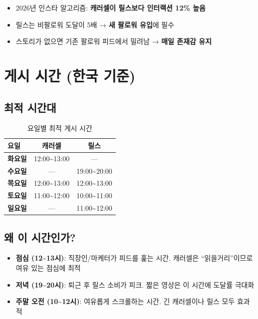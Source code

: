 \documentclass[11pt, a4paper]{article}
\begin{document}
\begin{itemize}[leftmargin=2em]
  \item 2026년 인스타 알고리즘: \textbf{캐러셀이 릴스보다 인터랙션 12\% 높음}
  \item 릴스는 비팔로워 도달이 5배 → \textbf{새 팔로워 유입}에 필수
  \item 스토리가 없으면 기존 팔로워 피드에서 밀려남 → \textbf{매일 존재감 유지}
\end{itemize}


\section{게시 시간 (한국 기준)}

\subsection{최적 시간대}

\begin{table}[h!]
\centering
\begin{tabular}{l c c}
\toprule
\textbf{요일} & \textbf{캐러셀} & \textbf{릴스} \\
\midrule
\textbf{화요일} & 12:00\textasciitilde 13:00 & — \\
\textbf{수요일} & — & 19:00\textasciitilde 20:00 \\
\textbf{목요일} & 12:00\textasciitilde 13:00 & 12:00\textasciitilde 13:00 \\
\textbf{토요일} & 11:00\textasciitilde 12:00 & 10:00\textasciitilde 11:00 \\
\textbf{일요일} & — & 11:00\textasciitilde 12:00 \\
\bottomrule
\end{tabular}
\caption{요일별 최적 게시 시간}
\end{table}

\subsection{왜 이 시간인가?}

\begin{itemize}[leftmargin=2em]
  \item \textbf{점심 (12\textasciitilde 13시)}: 직장인/마케터가 피드를 훑는 시간. 캐러셀은 ``읽을거리''이므로 여유 있는 점심에 최적
  \item \textbf{저녁 (19\textasciitilde 20시)}: 퇴근 후 릴스 소비가 피크. 짧은 영상은 이 시간에 도달률 극대화
  \item \textbf{주말 오전 (10\textasciitilde 12시)}: 여유롭게 스크롤하는 시간. 긴 캐러셀이나 릴스 모두 효과적
\end{itemize}
\end{document}

